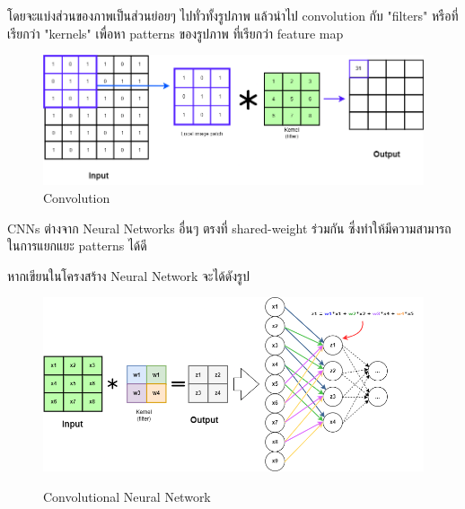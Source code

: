 โดยจะแบ่งส่วนของภาพเป็นส่วนย่อยๆ ไปทั่วทั้งรูปภาพ แล้วนำไป convolution กับ  "filters" หรือที่เรียกว่า "kernels" เพื่อหา patterns ของรูปภาพ ที่เรียกว่า feature map
\begin{figure}[h]
  \begin{center}
  \includegraphics[scale=0.35]{pic/cnn_1.png}
  \end{center}
  \caption[Convolution]{Convolution}
  \label{fig:Convolution }
  \end{figure}


CNNs ต่างจาก Neural Networks อื่นๆ ตรงที่  shared-weight ร่วมกัน ซึ่งทำให้มีความสามารถในการแยกแยะ patterns ได้ดี


หากเขียนในโครงสร้าง Neural Network จะได้ดังรูป
\begin{figure}[h]
  \begin{center}
  \includegraphics[scale=0.35]{pic/cnn_nn_1.png}\cite{CNN_mlp}
  \end{center}

  \caption[Convolutional Neural Network]{Convolutional Neural Network }
  \label{fig:Convolutional Neural Network }
  \end{figure}

  
  
